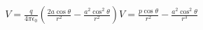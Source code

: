 \documentclass[preview]{standalone}
\begin{document}
\begin{align*}
V = \frac{q}{4\pi\epsilon_0} \left( \frac{2a\cos\theta}{r^2} - \frac{a^2\cos^2\theta}{r^2} \right) V = \frac{p\cos\theta}{r^2} - \frac{a^2\cos^2\theta}{r^3}
\end{align*}
\end{document}
